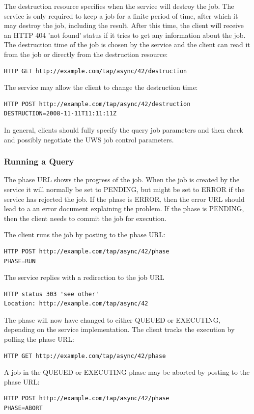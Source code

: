 \documentclass[11pt,letter]{ivoa}
\begin{document}
The destruction resource specifies when the service will destroy the job. The 
service is only required to keep a job for a finite period of time, after which 
it may destroy the job, including the result. After this time, the client will 
receive an HTTP 404 'not found' status if it tries to get any information about 
the job. The destruction time of the job is chosen by the service and the client 
can read it from the job or directly from the destruction resource:
\begin{verbatim}
HTTP GET http://example.com/tap/async/42/destruction
\end{verbatim}
The service may allow the client to change the destruction time:
\begin{verbatim}
HTTP POST http://example.com/tap/async/42/destruction
DESTRUCTION=2008-11-11T11:11:11Z
\end{verbatim}

In general, clients should fully specify the query job parameters and then 
check and possibly negotiate the UWS job control parameters.

\subsubsection{Running a Query}
The phase URL shows the progress of the job. When the job is created by the 
service it will normally be set to PENDING, but might be set to ERROR if the 
service has rejected the job. If the phase is ERROR, then the error URL should 
lead to a an error document explaining the problem. If the phase is PENDING, 
then the client needs to commit the job for execution.

The client runs the job by posting to the phase URL:
\begin{verbatim}
HTTP POST http://example.com/tap/async/42/phase
PHASE=RUN
\end{verbatim}

The service replies with a redirection to the job URL
\begin{verbatim}
HTTP status 303 'see other'
Location: http://example.com/tap/async/42
\end{verbatim}
The phase will now have changed to either QUEUED or EXECUTING, depending on the 
service implementation. The client tracks the execution by polling the phase 
URL:
\begin{verbatim}
HTTP GET http://example.com/tap/async/42/phase
\end{verbatim}
A job in the  QUEUED or EXECUTING phase may be aborted by posting to the phase 
URL:
\begin{verbatim}
HTTP POST http://example.com/tap/async/42/phase
PHASE=ABORT
\end{verbatim}
\end{document}
